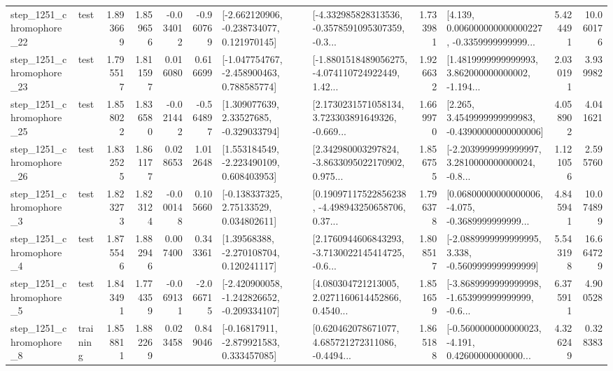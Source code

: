 \begin{tabular}{llrrrrllrlrr}
 step\_1251\_chromophore\_22 &      test &      1.893669 &    1.859656 &     -0.034012 & -0.960769 &   [-2.662120906, -0.238734077, 0.121970145] &  [-4.332985828313536, -0.3578591095307359, -0.3... &       1.733981 &  [4.139, 0.006000000000000227, -0.3359999999999... &            5.424491 &         10.060176 \\
 step\_1251\_chromophore\_23 &      test &      1.795517 &    1.811597 &      0.016080 &  0.616699 &   [-1.047754767, -2.458900463, 0.788585774] &  [-1.8801518489056275, -4.074110724922449, 1.42... &       1.926632 &  [1.4819999999999993, 3.862000000000002, -1.194... &            2.030191 &          3.939982 \\
 step\_1251\_chromophore\_25 &      test &      1.858022 &    1.836580 &     -0.021442 & -0.564897 &     [1.309077639, 2.33527685, -0.329033794] &  [2.1730231571058134, 3.723303891649326, -0.669... &       1.669970 &  [2.265, 3.4549999999999983, -0.43900000000000006] &            4.058902 &          4.041621 \\
 step\_1251\_chromophore\_26 &      test &      1.832525 &    1.861177 &      0.028653 &  1.012648 &    [1.553184549, -2.223490109, 0.608403953] &  [2.342980003297824, -3.8633095022170902, 0.975... &       1.856755 &  [-2.2039999999999997, 3.2810000000000024, -0.8... &            1.121056 &          2.595760 \\
  step\_1251\_chromophore\_3 &      test &      1.823273 &    1.823124 &     -0.000148 &  0.105660 &     [-0.138337325, 2.75133529, 0.034802611] &  [0.19097117522856238, -4.498943250658706, 0.37... &       1.796378 &  [0.06800000000000006, -4.075, -0.3689999999999... &            4.845941 &         10.074899 \\
  step\_1251\_chromophore\_4 &      test &      1.875546 &    1.882946 &      0.007400 &  0.343361 &     [1.39568388, -2.270108704, 0.120241117] &  [2.1760944606843293, -3.7130022145414725, -0.6... &       1.808517 &  [-2.0889999999999995, 3.338, -0.5609999999999999] &            5.543198 &         16.664729 \\
  step\_1251\_chromophore\_5 &      test &      1.843491 &    1.774359 &     -0.069131 & -2.066715 &  [-2.420900058, -1.242826652, -0.209334107] &  [4.080304721213005, 2.0271160614452866, 0.4540... &       1.851659 &  [-3.8689999999999998, -1.653999999999999, -0.6... &            6.375911 &          4.900528 \\
  step\_1251\_chromophore\_8 &  training &      1.858811 &    1.882269 &      0.023458 &  0.849046 &    [-0.16817911, -2.879921583, 0.333457085] &  [0.620462078671077, 4.685721272311086, -0.4494... &       1.865188 &  [-0.5600000000000023, -4.191, 0.42600000000000... &            4.326249 &          0.328383 \\

\end{tabular}
